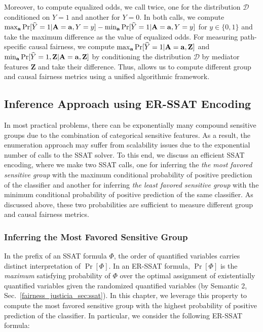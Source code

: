 Moreover, to compute equalized odds, we call {\justicia} twice, one for the distribution $ \mathcal{D} $ conditioned on $ Y = 1  $ and another for $ Y = 0 $. In both calls, we compute $ \max_{ \mathbf{a}} \Pr[\widehat{Y} =1 | \mathbf{A} = \mathbf{a}, Y = y ]  - \min_{ \mathbf{a}} \Pr[\widehat{Y} =1 | \mathbf{A} = \mathbf{a}, Y = y ] $ for $ y \in \{0,1\} $ and take the  maximum difference as the value of equalized odds. 
For measuring path-specific causal fairness, we compute  $ \max_{ \mathbf{a}} \Pr[\widehat{Y} =1 | \mathbf{A} = \mathbf{a}, \mathbf{Z}] $ and  $ \min_{ \mathbf{a}} \Pr[\widehat{Y} =1, \mathbf{Z}| \mathbf{A} = \mathbf{a} , \mathbf{Z}] $ by conditioning the distribution $ \mathcal{D} $ by mediator features $ \mathbf{Z} $ and take their difference. Thus, {\justiciaenum} allows us to compute different group and causal fairness metrics using a unified algorithmic framework.





\subsection{Inference Approach using ER-SSAT Encoding}
\label{fairness_justicia_sec:learn_ssat}
In most practical problems, there can be exponentially many compound sensitive groups due to the combination of categorical sensitive features.  As a result, the enumeration approach may suffer from scalability issues due to the exponential number of calls to the SSAT solver. To this end, we discuss an efficient SSAT encoding, where we make two SSAT calls, one for inferring the \emph{the most favored sensitive group} with the maximum conditional probability of positive prediction of the classifier and another for inferring \emph{the least favored sensitive group} with the minimum conditional probability of positive prediction of the same classifier. As discussed above, these two probabilities are sufficient to measure different group and causal fairness metrics.



\subsubsection{Inferring the Most Favored Sensitive Group}
In the prefix of an SSAT formula $ \Phi $, the order of quantified variables carries distinct interpretation of  $ \Pr[\Phi] $.   In an ER-SSAT formula, $ \Pr[\Phi] $ is the \textit{maximum} satisfying probability of $ \Phi $ over the optimal assignment of existentially quantified variables given the randomized quantified variables (by Semantic 2, Sec.~\ref{fairness_justicia_sec:ssat}). In this chapter, we leverage this property to compute the most favored sensitive group with the highest probability of positive prediction of the classifier. In particular, we consider the following ER-SSAT formula:

